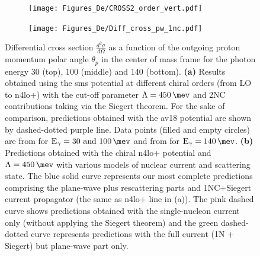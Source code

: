     \begin{figure}[h]
        \centering
        \begin{subfigure}[t]{0.46\textwidth}
            \caption{}
            \texttt{[image: Figures\_De/CROSS2\_order\_vert.pdf]}
            \label{Diff_cross_order}
        \end{subfigure}
        \begin{subfigure}[t]{0.46\textwidth}
            \caption{}
            \texttt{[image: Figures\_De/Diff\_cross\_pw\_1nc.pdf]}
            \label{Diff_cross_pw_1nc}
        \end{subfigure}
        \caption{Differential cross section $\frac{d^2\sigma}{d\Omega}$
        as a function of the outgoing proton momentum polar angle $\theta_p$ in the center of mass frame 
        for the photon energy \SI{30}{\mev} (top), \SI{100}{\mev} (middle) and \SI{140}{\mev} (bottom).
        {\bf (a)} Results obtained using the \gls{sms} potential
        at different chiral orders (from LO to \gls{n4lo+}) with the cut-off parameter $\Lambda=\SI{450}{\mev}$ and 
        2NC contributions taking via the Siegert theorem.
        For the sake of comparison, predictions obtained with the \gls*{av18} potential are shown
        by dashed-dotted purple line.
        Data points (filled and empty circles) are from \cite{Ying_Experiment_Deut}
        for $\text{E}_\gamma=\SIlist[list-units = single]{30; 100}{\mev}$
        and from \cite{DeSanctis_Experiment_Deut} for $\text{E}_\gamma=\SI{140}{\mev}$.
        {\bf (b)} Predictions obtained with the chiral \gls{n4lo+} potential and $\Lambda=\SI{450}{\mev}$
        with various models of nuclear current and scattering state.
        The blue solid curve represents our most complete predictions
        comprising the plane-wave plus rescattering parts and 1NC+Siegert current propagator 
        (the same as \gls{n4lo+} line in (a)).
        The pink dashed curve shows predictions obtained with
        the single-nucleon current only (without applying the Siegert theorem) and the green dashed-dotted
        curve represents predictions with the full current (1N + Siegert) but plane-wave part only.
        }
        \label{Diff_cross_order_pw}
    \end{figure}


